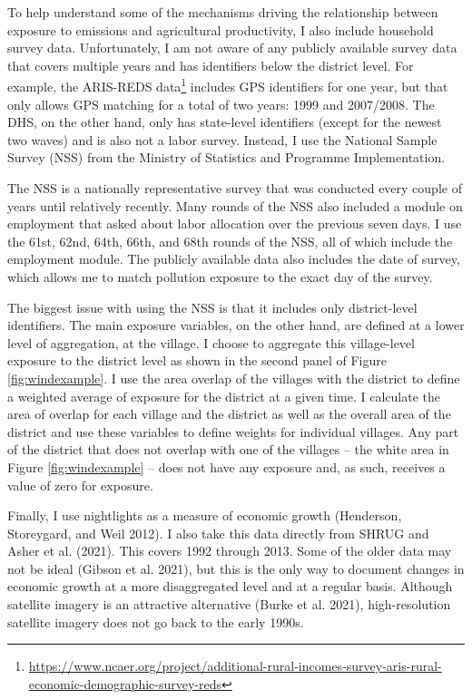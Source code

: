 \documentclass[
]{article}
\begin{document}
To help understand some of the mechanisms driving the relationship between exposure to emissions and agricultural productivity, I also include household survey data. Unfortunately, I am not aware of any publicly available survey data that covers multiple years and has identifiers below the district level. For example, the ARIS-REDS data\footnote{\url{https://www.ncaer.org/project/additional-rural-incomes-survey-aris-rural-economic-demographic-survey-reds}} includes GPS identifiers for one year, but that only allows GPS matching for a total of two years: 1999 and 2007/2008. The DHS, on the other hand, only has state-level identifiers (except for the newest two waves) and is also not a labor survey. Instead, I use the National Sample Survey (NSS) from the Ministry of Statistics and Programme Implementation.

The NSS is a nationally representative survey that was conducted every couple of years until relatively recently. Many rounds of the NSS also included a module on employment that asked about labor allocation over the previous seven days. I use the 61st, 62nd, 64th, 66th, and 68th rounds of the NSS, all of which include the employment module. The publicly available data also includes the date of survey, which allows me to match pollution exposure to the exact day of the survey.

The biggest issue with using the NSS is that it includes only district-level identifiers. The main exposure variables, on the other hand, are defined at a lower level of aggregation, at the village. I choose to aggregate this village-level exposure to the district level as shown in the second panel of Figure \ref{fig:windexample}. I use the area overlap of the villages with the district to define a weighted average of exposure for the district at a given time. I calculate the area of overlap for each village and the district as well as the overall area of the district and use these variables to define weights for individual villages. Any part of the district that does not overlap with one of the villages -- the white area in Figure \ref{fig:windexample} -- does not have any exposure and, as such, receives a value of zero for exposure.

Finally, I use nightlights as a measure of economic growth (Henderson, Storeygard, and Weil 2012). I also take this data directly from SHRUG and Asher et al. (2021). This covers 1992 through 2013. Some of the older data may not be ideal (Gibson et al. 2021), but this is the only way to document changes in economic growth at a more disaggregated level and at a regular basis. Although satellite imagery is an attractive alternative (Burke et al. 2021), high-resolution satellite imagery does not go back to the early 1990s.
\end{document}

